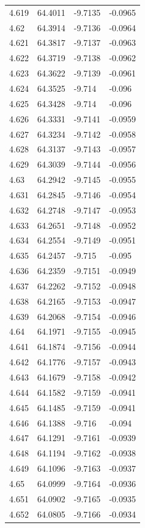 \begin{tabular}{llll}
4.619 & 64.4011 & -9.7135 & -0.0965 \\
4.62 & 64.3914 & -9.7136 & -0.0964 \\
4.621 & 64.3817 & -9.7137 & -0.0963 \\
4.622 & 64.3719 & -9.7138 & -0.0962 \\
4.623 & 64.3622 & -9.7139 & -0.0961 \\
4.624 & 64.3525 & -9.714 & -0.096 \\
4.625 & 64.3428 & -9.714 & -0.096 \\
4.626 & 64.3331 & -9.7141 & -0.0959 \\
4.627 & 64.3234 & -9.7142 & -0.0958 \\
4.628 & 64.3137 & -9.7143 & -0.0957 \\
4.629 & 64.3039 & -9.7144 & -0.0956 \\
4.63 & 64.2942 & -9.7145 & -0.0955 \\
4.631 & 64.2845 & -9.7146 & -0.0954 \\
4.632 & 64.2748 & -9.7147 & -0.0953 \\
4.633 & 64.2651 & -9.7148 & -0.0952 \\
4.634 & 64.2554 & -9.7149 & -0.0951 \\
4.635 & 64.2457 & -9.715 & -0.095 \\
4.636 & 64.2359 & -9.7151 & -0.0949 \\
4.637 & 64.2262 & -9.7152 & -0.0948 \\
4.638 & 64.2165 & -9.7153 & -0.0947 \\
4.639 & 64.2068 & -9.7154 & -0.0946 \\
4.64 & 64.1971 & -9.7155 & -0.0945 \\
4.641 & 64.1874 & -9.7156 & -0.0944 \\
4.642 & 64.1776 & -9.7157 & -0.0943 \\
4.643 & 64.1679 & -9.7158 & -0.0942 \\
4.644 & 64.1582 & -9.7159 & -0.0941 \\
4.645 & 64.1485 & -9.7159 & -0.0941 \\
4.646 & 64.1388 & -9.716 & -0.094 \\
4.647 & 64.1291 & -9.7161 & -0.0939 \\
4.648 & 64.1194 & -9.7162 & -0.0938 \\
4.649 & 64.1096 & -9.7163 & -0.0937 \\
4.65 & 64.0999 & -9.7164 & -0.0936 \\
4.651 & 64.0902 & -9.7165 & -0.0935 \\
4.652 & 64.0805 & -9.7166 & -0.0934 \\

\end{tabular}
